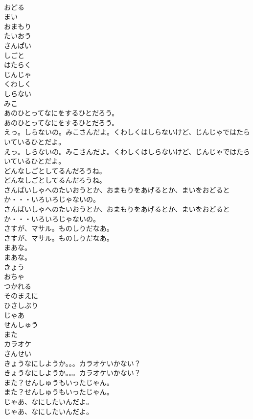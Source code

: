 \documentclass[8pt]{extreport}
\begin{document}
\begin{CJK}{UTF8}{min}
\\	おどる
\\	まい
\\	おまもり
\\	たいおう
\\	さんぱい
\\	しごと
\\	はたらく
\\	じんじゃ
\\	くわしく
\\	しらない
\\	みこ
\\	あのひとってなにをするひとだろう。	
\\	あのひとってなにをするひとだろう。 
\\	えっ。しらないの。みこさんだよ。くわしくはしらないけど、じんじゃではたらいているひとだよ。	
\\	えっ。しらないの。みこさんだよ。くわしくはしらないけど、じんじゃではたらいているひとだよ。 
\\	どんなしごとしてるんだろうね。	
\\	どんなしごとしてるんだろうね。 
\\	さんぱいしゃへのたいおうとか、おまもりをあげるとか、まいをおどるとか・・・いろいろじゃないの。	
\\	さんぱいしゃへのたいおうとか、おまもりをあげるとか、まいをおどるとか・・・いろいろじゃないの。 
\\	さすが、マサル。ものしりだなあ。	
\\	さすが、マサル。ものしりだなあ。 
\\	まあな。	
\\	まあな。 
\\	きょう
\\	おちゃ
\\	つかれる
\\	そのまえに
\\	ひさしぶり
\\	じゃあ
\\	せんしゅう
\\	また
\\	カラオケ
\\	さんせい
\\	きょうなにしようか。。。カラオケいかない？	
\\	きょうなにしようか。。。カラオケいかない？ 
\\	また？せんしゅうもいったじゃん。	
\\	また？せんしゅうもいったじゃん。 
\\	じゃあ、なにしたいんだよ。	
\\	じゃあ、なにしたいんだよ。 

\end{CJK}
\end{document}
